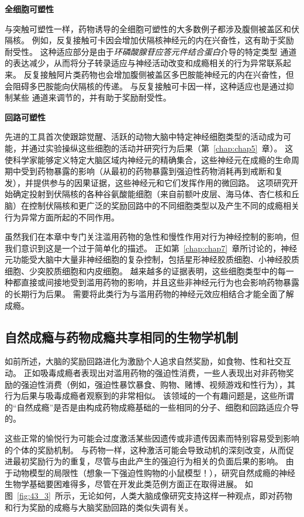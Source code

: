 \textbf{全细胞可塑性}

与突触可塑性一样，药物诱导的全细胞可塑性的大多数例子都涉及腹侧被盖区和伏隔核。
例如，反复接触可卡因会增加伏隔核神经元的内在兴奋性，这有助于奖励耐受性。
这种适应部分是由于\textit{环磷酸腺苷应答元件结合蛋白}介导的特定类型  通道的表达减少，从而将分子转录适应与神经活动改变和成瘾相关的行为异常联系起来。
反复接触阿片类药物也会增加腹侧被盖区多巴胺能神经元的内在兴奋性，但会阻碍多巴胺能向伏隔核的传递。
与反复接触可卡因一样，这种适应也是通过抑制某些  通道来调节的，并有助于奖励耐受性。


\textbf{回路可塑性}

先进的工具首次使跟踪觉醒、活跃的动物大脑中特定神经细胞类型的活动成为可能，并通过实验操纵这些细胞的活动并研究行为后果（第~\ref{chap:chap5}~章）。
这使科学家能够定义特定大脑区域内神经元的精确集合，这些神经元在成瘾的生命周期中受到药物暴露的影响（从最初的药物暴露到强迫性药物消耗再到戒断和复发），并提供参与的因果证据，这些神经元和它们发挥作用的微回路。
这项研究开始确定投射到伏隔核的各种谷氨酸能细胞（来自前额叶皮层、海马体、杏仁核和丘脑）在控制伏隔核和更广泛的奖励回路中的不同细胞类型以及产生不同的成瘾相关行为异常方面所起的不同作用。


虽然我们在本章中专门关注滥用药物的急性和慢性作用对行为神经控制的影响，但我们意识到这是一个过于简单化的描述。
正如第~\ref{chap:chap7}~章所讨论的，神经元功能受大脑中大量非神经细胞的复杂控制，包括星形神经胶质细胞、小神经胶质细胞、少突胶质细胞和内皮细胞。
越来越多的证据表明，这些细胞类型中的每一种都直接或间接地受到滥用药物的影响，并且这些非神经元行为也会影响药物暴露的长期行为后果。
需要将此类行为与滥用药物的神经元效应相结合才能全面了解成瘾。



\subsection{自然成瘾与药物成瘾共享相同的生物学机制}

如前所述，大脑的奖励回路进化为激励个人追求自然奖励，如食物、性和社交互动。
正如吸毒成瘾者表现出对滥用药物的强迫性消费，一些人表现出对非药物奖励的强迫性消费（例如，强迫性暴饮暴食、购物、赌博、视频游戏和性行为），其行为后果与吸毒成瘾者观察到的非常相似。
该领域的一个有趣问题是，这些所谓的“自然成瘾”是否是由构成药物成瘾基础的一些相同的分子、细胞和回路适应介导的。


这些正常的愉悦行为可能会过度激活某些因遗传或非遗传因素而特别容易受到影响的个体的奖励机制。
与药物一样，这种激活可能会导致动机的深刻改变，从而促进最初奖励行为的重复，尽管与由此产生的强迫行为相关的负面后果的影响。
由于动物模型的局限性（想象一下强迫性购物的小鼠模型！），研究自然成瘾的神经生物学基础要困难得多，尽管在开发此类范例方面正在取得进展。
如图~\ref{fig:43_3}~所示，无论如何，人类大脑成像研究支持这样一种观点，即对药物和行为奖励的成瘾与大脑奖励回路的类似失调有关。



